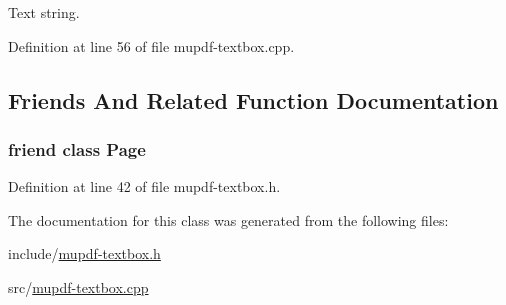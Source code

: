 Text string. 



Definition at line 56 of file mupdf-\/textbox.\-cpp.



\subsection{Friends And Related Function Documentation}
\hypertarget{class_mu_p_d_f_1_1_text_box_a66d145c56e1747e0aecb5309042ab183}{
\subsubsection[{Page}]{\setlength{\rightskip}{0pt plus 5cm}friend class {\bf Page}\hspace{0.3cm}{\ttfamily [friend]}}}\label{class_mu_p_d_f_1_1_text_box_a66d145c56e1747e0aecb5309042ab183}


Definition at line 42 of file mupdf-\/textbox.\-h.



The documentation for this class was generated from the following files\-:\begin{DoxyCompactItemize}
\item 
include/\hyperlink{mupdf-textbox_8h}{mupdf-\/textbox.\-h}\item 
src/\hyperlink{mupdf-textbox_8cpp}{mupdf-\/textbox.\-cpp}\end{DoxyCompactItemize}
